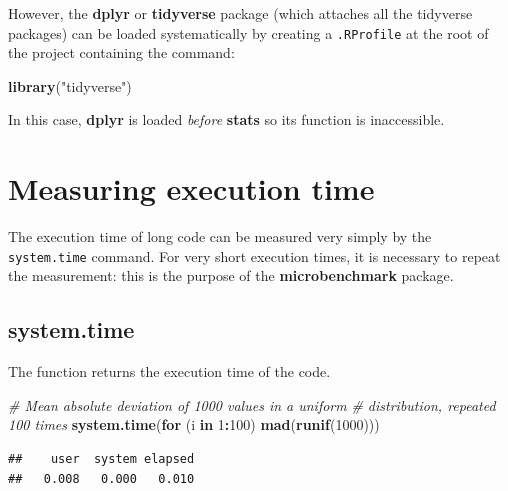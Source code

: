 \documentclass[
  12pt,
  american,
  a4paper,
  extrafontsizes,onecolumn,openright
  ]{memoir}
\newenvironment{Shaded}{\begin{snugshade}}{\end{snugshade}}
\newcommand{\CommentTok}[1]{\textcolor[rgb]{0.56,0.35,0.01}{\textit{#1}}}
\newcommand{\ControlFlowTok}[1]{\textcolor[rgb]{0.13,0.29,0.53}{\textbf{#1}}}
\newcommand{\DecValTok}[1]{\textcolor[rgb]{0.00,0.00,0.81}{#1}}
\newcommand{\FunctionTok}[1]{\textcolor[rgb]{0.13,0.29,0.53}{\textbf{#1}}}
\newcommand{\NormalTok}[1]{#1}
\newcommand{\SpecialCharTok}[1]{\textcolor[rgb]{0.81,0.36,0.00}{\textbf{#1}}}
\newcommand{\StringTok}[1]{\textcolor[rgb]{0.31,0.60,0.02}{#1}}
\begin{document}
However, the \textbf{dplyr} or \textbf{tidyverse} package (which attaches all the tidyverse packages) can be loaded systematically by creating a \texttt{.RProfile} at the root of the project containing the command:

\scriptsize

\begin{Shaded}
\begin{Highlighting}[]
\FunctionTok{library}\NormalTok{(}\StringTok{"tidyverse"}\NormalTok{)}
\end{Highlighting}
\end{Shaded}

\normalsize

In this case, \textbf{dplyr} is loaded \emph{before} \textbf{stats} so its function is inaccessible.

\section{Measuring execution time}\label{measuring-execution-time}

The execution time of long code can be measured very simply by the \texttt{system.time} command.
For very short execution times, it is necessary to repeat the measurement: this is the purpose of the \textbf{microbenchmark} package.

\subsection{system.time}\label{system.time}

The function returns the execution time of the code.

\scriptsize

\begin{Shaded}
\begin{Highlighting}[]
\CommentTok{\# Mean absolute deviation of 1000 values in a uniform}
\CommentTok{\# distribution, repeated 100 times}
\FunctionTok{system.time}\NormalTok{(}\ControlFlowTok{for}\NormalTok{ (i }\ControlFlowTok{in} \DecValTok{1}\SpecialCharTok{:}\DecValTok{100}\NormalTok{) }\FunctionTok{mad}\NormalTok{(}\FunctionTok{runif}\NormalTok{(}\DecValTok{1000}\NormalTok{)))}
\end{Highlighting}
\end{Shaded}

\begin{verbatim}
##    user  system elapsed 
##   0.008   0.000   0.010
\end{verbatim}
\end{document}
